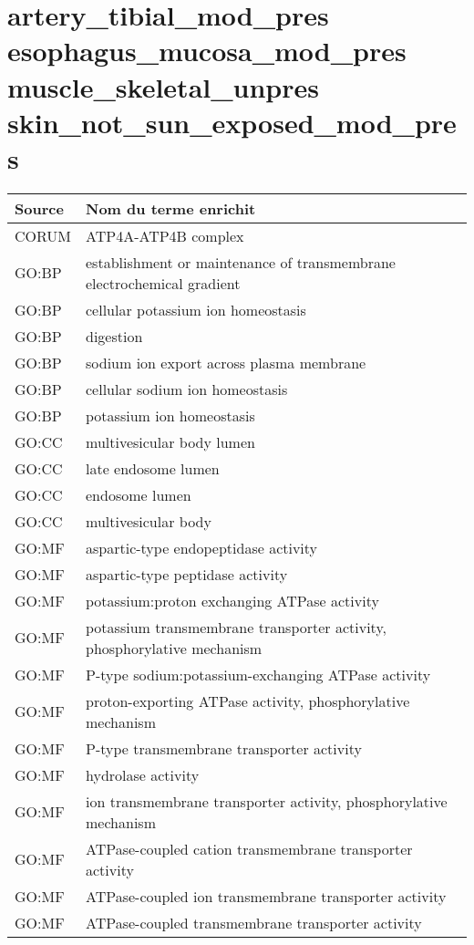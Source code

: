 \section*{artery\_tibial\_mod\_pres \newline esophagus\_mucosa\_mod\_pres \newline muscle\_skeletal\_unpres \newline skin\_not\_sun\_exposed\_mod\_pres}

\begin{longtable}{ll}
\toprule
Source & Nom du terme enrichit\\
\midrule
CORUM & ATP4A-ATP4B complex\\
GO:BP & establishment or maintenance of transmembrane electrochemical gradient\\
GO:BP & cellular potassium ion homeostasis\\
GO:BP & digestion\\
GO:BP & sodium ion export across plasma membrane\\
GO:BP & cellular sodium ion homeostasis\\
GO:BP & potassium ion homeostasis\\
GO:CC & multivesicular body lumen\\
GO:CC & late endosome lumen\\
GO:CC & endosome lumen\\
GO:CC & multivesicular body\\
GO:MF & aspartic-type endopeptidase activity\\
GO:MF & aspartic-type peptidase activity\\
GO:MF & potassium:proton exchanging ATPase activity\\
GO:MF & potassium transmembrane transporter activity, phosphorylative mechanism\\
GO:MF & P-type sodium:potassium-exchanging ATPase activity\\
GO:MF & proton-exporting ATPase activity, phosphorylative mechanism\\
GO:MF & P-type transmembrane transporter activity\\
GO:MF & hydrolase activity\\
GO:MF & ion transmembrane transporter activity, phosphorylative mechanism\\
GO:MF & ATPase-coupled cation transmembrane transporter activity\\
GO:MF & ATPase-coupled ion transmembrane transporter activity\\
GO:MF & ATPase-coupled transmembrane transporter activity\\

\end{longtable}
